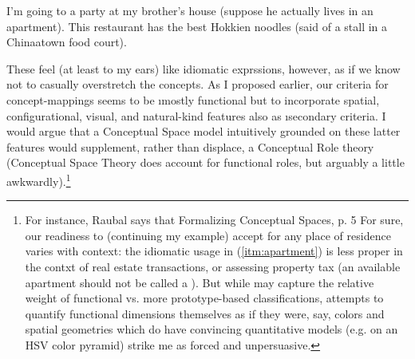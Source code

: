 {\begin{sentenceList}\sentenceItem{} \label{itm:apartment} I'm going to a party at my brother's house (suppose 
he actually lives in an apartment).
\sentenceItem{} This restaurant has the best Hokkien noodles 
(said of a stall in a Chinaatown food court).
\end{sentenceList}
These feel (at least to my ears) like idiomatic 
exprssions, however, as if we know not to casually 
overstretch the concepts.  As I proposed earlier, our 
criteria for concept-mappings seems to be \i{mostly} functional 
but to incorporate spatial, configurational, visual, and 
natural-kind features also as \i{secondary} criteria.  I 
would argue that a Conceptual Space model intuitively 
grounded on these latter features would supplement, 
rather than displace, a Conceptual Role theory 
(Conceptual Space Theory does account for functional 
roles, but arguably a little awkwardly).\footnote{For instance, Raubal says that   
Formalizing Conceptual Spaces, p. 5 For sure, our readiness to 
(continuing my example) accept  for any place 
of residence varies with context: the idiomatic 
usage in (\ref{itm:apartment}) is less proper in the contxt of 
real estate transactions, or assessing property 
tax (an available apartment should not be 
called a ).  But while 
 may capture the relative 
weight of functional vs. more 
prototype-based classifications, attempts to 
quantify functional dimensions themselves as if 
they were, say, colors and spatial geometries \mdash{} which do 
have convincing quantitative models 
(e.g.  on an HSV color pyramid) \mdash{} strike 
me as forced and unpersuasive.
}
}
